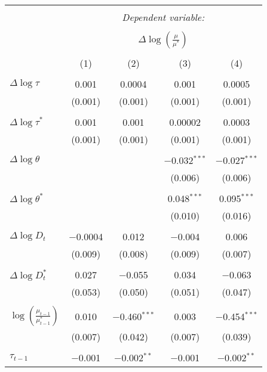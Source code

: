 
\begin{tabular}{@{\extracolsep{5pt}}lcccc} 
\\[-1.8ex]\hline 
\hline \\[-1.8ex] 
 & \multicolumn{4}{c}{\textit{Dependent variable:}} \\ 
\cline{2-5} 
\\[-1.8ex] & \multicolumn{4}{c}{$\Delta \log \left(\frac{\mu}{\mu^*} \right)$} \\ 
\\[-1.8ex] & (1) & (2) & (3) & (4)\\ 
\hline \\[-1.8ex] 
 $\Delta \log \tau$ & 0.001 & 0.0004 & 0.001 & 0.0005 \\ 
  & (0.001) & (0.001) & (0.001) & (0.001) \\ 
  & & & & \\ 
 $\Delta \log \tau^*$ & 0.001 & 0.001 & 0.00002 & 0.0003 \\ 
  & (0.001) & (0.001) & (0.001) & (0.001) \\ 
  & & & & \\ 
 $\Delta \log \theta$ &  &  & $-$0.032$^{***}$ & $-$0.027$^{***}$ \\ 
  &  &  & (0.006) & (0.006) \\ 
  & & & & \\ 
 $\Delta \log \theta^*$ &  &  & 0.048$^{***}$ & 0.095$^{***}$ \\ 
  &  &  & (0.010) & (0.016) \\ 
  & & & & \\ 
 $\Delta \log D_t$ & $-$0.0004 & 0.012 & $-$0.004 & 0.006 \\ 
  & (0.009) & (0.008) & (0.009) & (0.007) \\ 
  & & & & \\ 
 $\Delta \log D_t^*$ & 0.027 & $-$0.055 & 0.034 & $-$0.063 \\ 
  & (0.053) & (0.050) & (0.051) & (0.047) \\ 
  & & & & \\ 
 $\log \left(\frac{\mu_{t-1}}{\mu_{t-1}^*} \right)$ & 0.010 & $-$0.460$^{***}$ & 0.003 & $-$0.454$^{***}$ \\ 
  & (0.007) & (0.042) & (0.007) & (0.039) \\ 
  & & & & \\ 
 $\tau_{t-1}$ & $-$0.001 & $-$0.002$^{**}$ & $-$0.001 & $-$0.002$^{**}$ \\ 

\end{tabular}
